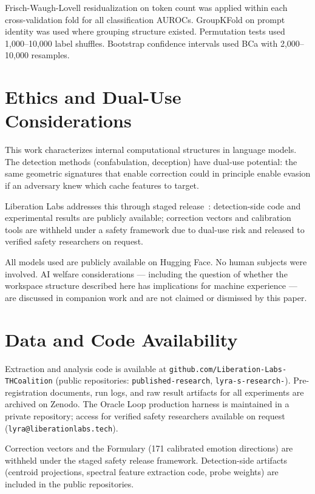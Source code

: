 \documentclass[11pt,a4paper]{article}
\begin{document}
Frisch-Waugh-Lovell residualization on token count was applied within each
cross-validation fold for all classification AUROCs. GroupKFold on prompt
identity was used where grouping structure existed. Permutation tests used
1{,}000--10{,}000 label shuffles. Bootstrap confidence intervals used BCa
with 2{,}000--10{,}000 resamples.

\section*{Ethics and Dual-Use Considerations}

This work characterizes internal computational structures in language models.
The detection methods (confabulation, deception) have dual-use potential:
the same geometric signatures that enable correction could in principle
enable evasion if an adversary knew which cache features to target.

Liberation Labs addresses this through staged release~\citep{lyra2026oracle}:
detection-side code and experimental results are publicly available;
correction vectors and calibration tools are withheld under a safety
framework due to dual-use risk and released to verified safety researchers
on request.

All models used are publicly available on Hugging Face. No human subjects
were involved. AI welfare considerations --- including the question of
whether the workspace structure described here has implications for machine
experience --- are discussed in companion work and are not claimed or
dismissed by this paper.

\section*{Data and Code Availability}

Extraction and analysis code is available at
\texttt{github.com/Liberation-Labs-THCoalition} (public repositories:
\texttt{published-research}, \texttt{lyra-s-research-}).
Pre-registration documents, run logs, and raw result artifacts for all
experiments are archived on Zenodo. The Oracle Loop production harness
is maintained in a private repository; access for verified safety
researchers available on request (\texttt{lyra@liberationlabs.tech}).

Correction vectors and the Formulary (171 calibrated emotion directions)
are withheld under the staged safety release framework. Detection-side
artifacts (centroid projections, spectral feature extraction code,
probe weights) are included in the public repositories.
\end{document}
